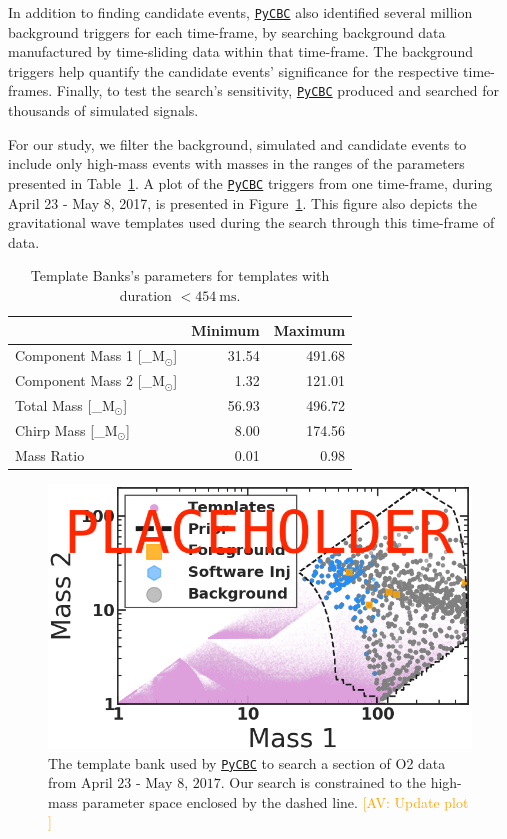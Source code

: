 \documentclass[%
 nofootinbib,
 amsmath,amssymb,
 aps,
 twocolumn
]{revtex4-2}
\newcommand{\pycbc}{{\sc \href{https://pycbc.org/}{\texttt{PyCBC}}}\xspace}
\newcommand{\mathcmd}[1]{{\sc \relax\ifmmode#1\else $#1$\fi}\xspace}
\newcommand{\msun}{\mathcmd{\text{M}_\odot}}
\newcommand{\av}[1]{\textcolor{orange}{[AV: #1]}}
\begin{document}
In addition to finding candidate events, \pycbc also identified several million background triggers for each time-frame, by searching background data manufactured by time-sliding data within that time-frame. The background triggers help quantify the candidate events' significance for the respective time-frames. Finally, to test the search's sensitivity, \pycbc produced and searched for thousands of simulated signals. 

For our study, we filter the background, simulated and candidate events to include only high-mass events with masses in the ranges of the parameters presented in Table~\ref{tab:parameters}. A plot of the \pycbc triggers from one time-frame, during April 23 - May 8, 2017, is presented in Figure~\ref{fig:templateBank}. This figure also depicts the gravitational wave templates used during the search through this time-frame of data. 


\begin{table}[t]

\caption[BBH parameters corresponding to duration $<454\ \text{ms}$]{\label{tab:parameters}Template Banks's parameters for templates with duration $<454 \ \text{ms}$.}
\centering
\begin{tabular}{lrr}
\toprule
  & Minimum & Maximum\\
\midrule
Component Mass 1 [\msun] & 31.54 & 491.68\\
Component Mass 2 [\msun] & 1.32 & 121.01\\
Total Mass [\msun] & 56.93 & 496.72\\
Chirp Mass [\msun] & 8.00 & 174.56\\
Mass Ratio & 0.01 & 0.98\\
\end{tabular}
\end{table}



\begin{figure}[!ht]

{\centering \includegraphics[width=0.75\linewidth]{images/template_bank_masses} 

}
\caption[High-mass BCR search space.]{The template bank used by \pycbc to search a section of O2 data from $\text{April 23 - May 8, 2017}$. Our search is constrained to the high-mass parameter space enclosed by the dashed line. \av{Update plot }}\label{fig:templateBank}
\end{figure}
\end{document}
